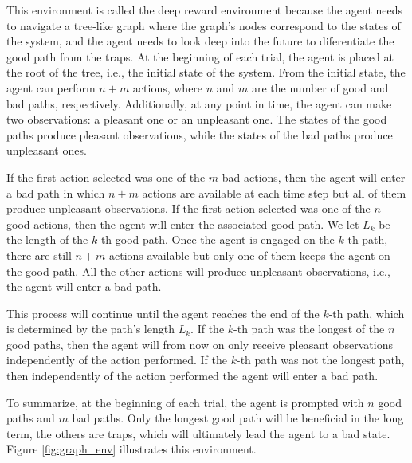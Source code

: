 \documentclass[twoside,11pt]{article}
\begin{document}
This environment is called the deep reward environment because the agent needs to navigate a tree-like graph where the graph’s nodes correspond to the states of the system, and the agent needs to look deep into the future to diferentiate the good path from the traps. At the beginning of each trial, the agent is placed at the root of the tree, i.e., the initial state of the system. From the initial state, the agent can perform $n + m$ actions, where $n$ and $m$ are the number of good and bad paths, respectively. Additionally, at any point in time, the agent can make two observations: a pleasant one or an unpleasant one. The states of the good paths produce pleasant observations, while the states of the bad paths produce unpleasant ones.

If the first action selected was one of the $m$ bad actions, then the agent will enter a bad path in which $n + m$ actions are available at each time step but all of them produce unpleasant observations. If the first action selected was one of the $n$ good actions, then the agent will enter the associated good path. We let $L_k$ be the length of the $k$-th good path. Once the agent is engaged on the $k$-th path, there are still $n + m$ actions available but only one of them keeps the agent on the good path. All the other actions will produce unpleasant observations, i.e., the agent will enter a bad path.

This process will continue until the agent reaches the end of the $k$-th path, which is determined by the path's length $L_k$. If the $k$-th path was the longest of the $n$ good paths, then the agent will from now on only receive pleasant observations independently of the action performed. If the $k$-th path was not the longest path, then independently of the action performed the agent will enter a bad path.

To summarize, at the beginning of each trial, the agent is prompted with $n$ good paths and $m$ bad paths. Only the longest good path will be beneficial in the long term, the others are traps, which will ultimately lead the agent to a bad state. Figure \ref{fig:graph_env} illustrates this environment.
\end{document}
